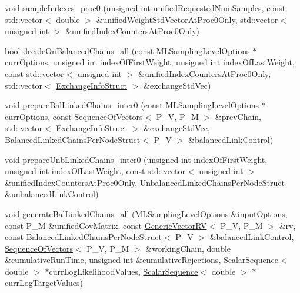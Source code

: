 \begin{DoxyCompactItemize}
void \hyperlink{class_q_u_e_s_o_1_1_m_l_sampling_af71979655e46135b6a3c97b8909321f0}{sample\-Indexes\-\_\-proc0} (unsigned int unified\-Requested\-Num\-Samples, const std\-::vector$<$ double $>$ \&unified\-Weight\-Std\-Vector\-At\-Proc0\-Only, std\-::vector$<$ unsigned int $>$ \&unified\-Index\-Counters\-At\-Proc0\-Only)
\item 
bool \hyperlink{class_q_u_e_s_o_1_1_m_l_sampling_a0f6f7872635b9546b3215fee347601f6}{decide\-On\-Balanced\-Chains\-\_\-all} (const \hyperlink{class_q_u_e_s_o_1_1_m_l_sampling_level_options}{M\-L\-Sampling\-Level\-Options} $\ast$curr\-Options, unsigned int index\-Of\-First\-Weight, unsigned int index\-Of\-Last\-Weight, const std\-::vector$<$ unsigned int $>$ \&unified\-Index\-Counters\-At\-Proc0\-Only, std\-::vector$<$ \hyperlink{struct_q_u_e_s_o_1_1_exchange_info_struct}{Exchange\-Info\-Struct} $>$ \&exchange\-Std\-Vec)
\item 
void \hyperlink{class_q_u_e_s_o_1_1_m_l_sampling_a75b2d73a0b07f594951a89cc1bc96849}{prepare\-Bal\-Linked\-Chains\-\_\-inter0} (const \hyperlink{class_q_u_e_s_o_1_1_m_l_sampling_level_options}{M\-L\-Sampling\-Level\-Options} $\ast$curr\-Options, const \hyperlink{class_q_u_e_s_o_1_1_sequence_of_vectors}{Sequence\-Of\-Vectors}$<$ P\-\_\-\-V, P\-\_\-\-M $>$ \&prev\-Chain, std\-::vector$<$ \hyperlink{struct_q_u_e_s_o_1_1_exchange_info_struct}{Exchange\-Info\-Struct} $>$ \&exchange\-Std\-Vec, \hyperlink{struct_q_u_e_s_o_1_1_balanced_linked_chains_per_node_struct}{Balanced\-Linked\-Chains\-Per\-Node\-Struct}$<$ P\-\_\-\-V $>$ \&balanced\-Link\-Control)
\item 
void \hyperlink{class_q_u_e_s_o_1_1_m_l_sampling_a37dcf4d893b6c8f67fe077892bada773}{prepare\-Unb\-Linked\-Chains\-\_\-inter0} (unsigned int index\-Of\-First\-Weight, unsigned int index\-Of\-Last\-Weight, const std\-::vector$<$ unsigned int $>$ \&unified\-Index\-Counters\-At\-Proc0\-Only, \hyperlink{struct_q_u_e_s_o_1_1_unbalanced_linked_chains_per_node_struct}{Unbalanced\-Linked\-Chains\-Per\-Node\-Struct} \&unbalanced\-Link\-Control)
\item 
void \hyperlink{class_q_u_e_s_o_1_1_m_l_sampling_a8e9d7681d17623c726814d206c8be4b2}{generate\-Bal\-Linked\-Chains\-\_\-all} (\hyperlink{class_q_u_e_s_o_1_1_m_l_sampling_level_options}{M\-L\-Sampling\-Level\-Options} \&input\-Options, const P\-\_\-\-M \&unified\-Cov\-Matrix, const \hyperlink{class_q_u_e_s_o_1_1_generic_vector_r_v}{Generic\-Vector\-R\-V}$<$ P\-\_\-\-V, P\-\_\-\-M $>$ \&rv, const \hyperlink{struct_q_u_e_s_o_1_1_balanced_linked_chains_per_node_struct}{Balanced\-Linked\-Chains\-Per\-Node\-Struct}$<$ P\-\_\-\-V $>$ \&balanced\-Link\-Control, \hyperlink{class_q_u_e_s_o_1_1_sequence_of_vectors}{Sequence\-Of\-Vectors}$<$ P\-\_\-\-V, P\-\_\-\-M $>$ \&working\-Chain, double \&cumulative\-Run\-Time, unsigned int \&cumulative\-Rejections, \hyperlink{class_q_u_e_s_o_1_1_scalar_sequence}{Scalar\-Sequence}$<$ double $>$ $\ast$curr\-Log\-Likelihood\-Values, \hyperlink{class_q_u_e_s_o_1_1_scalar_sequence}{Scalar\-Sequence}$<$ double $>$ $\ast$curr\-Log\-Target\-Values)

\end{DoxyCompactItemize}
